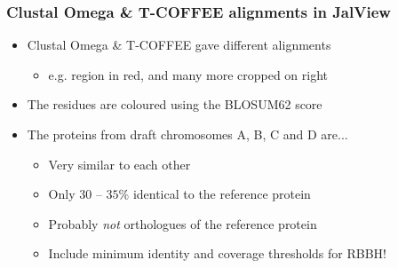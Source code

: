 \begin{frame}[fragile]
\frametitle{Clustal Omega \& T-COFFEE alignments in JalView}
\begin{center}
\begin{itemize}
\item Clustal Omega \& T-COFFEE gave different alignments
    \begin{itemize}
    \item e.g. region in red, and many more cropped on right
    \end{itemize}
\item The residues are coloured using the BLOSUM62 score
\item The proteins from draft chromosomes A, B, C and D are...
    \begin{itemize}
    \item Very similar to each other
    \item Only $30$ -- $35\%$ identical to the reference protein
    \item Probably \textit{not} orthologues of the reference protein
    \item Include minimum identity and coverage thresholds for RBBH!
    \end{itemize}
\end{itemize}
\end{center}
\end{frame}